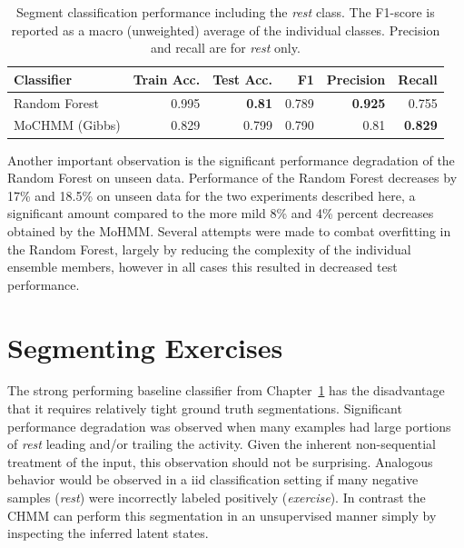 \documentclass[12pt]{report}
\newcommand{\1}[0]{\mathbbm{1}}
\begin{document}
\begin{table}[ht]
    \centering
    \begin{tabular}{l r r r r r}\hline
    \textbf{Classifier} & \textbf{Train Acc.} & \textbf{Test Acc.} & \textbf{F1}    & \textbf{Precision} & \textbf{Recall} \\\hline
    Random Forest       & 0.995               & \textbf{0.81}      & 0.789          & \textbf{0.925}     & 0.755 \\
    MoCHMM (Gibbs)       & 0.829               & 0.799              & 0.790          & 0.81               & \textbf{0.829} \\
    \end{tabular}
    \caption[Performance on the segmented exercise task with \emph{rest}]{
        Segment classification performance including the \emph{rest} class.
        The F1-score is reported as a macro (unweighted) average of the individual classes.
        Precision and recall are for \emph{rest} only.
    }
    \label{table:segment-results-rest}
\end{table}

Another important observation is the significant performance degradation of the Random Forest
on unseen data. Performance of the Random Forest decreases by 17\% and 18.5\% on unseen data
for the two experiments described here, a significant amount compared to the more mild 8\% and 4\%
percent decreases obtained by the \ac{MoHMM}. Several attempts were made to combat overfitting in
the Random Forest, largely by reducing the complexity of the individual ensemble members, however
in all cases this resulted in decreased test performance.


\chapter{Segmenting Exercises}
\label{chap:Segmenting Exercises}
The strong performing baseline classifier from Chapter~\ref{chap:Segmenting Exercises} has the disadvantage
that it requires relatively tight ground truth segmentations. Significant performance degradation
was observed when many examples had large portions of \emph{rest} leading and/or trailing the activity.
Given the inherent non-sequential treatment of the input, this observation should not be surprising.
Analogous behavior would be observed in a \ac{iid} classification setting if many
negative samples (\emph{rest}) were incorrectly labeled positively (\emph{exercise}).
In contrast the \ac{CHMM} can perform this segmentation in an unsupervised manner simply by inspecting the
inferred latent states.
\end{document}
